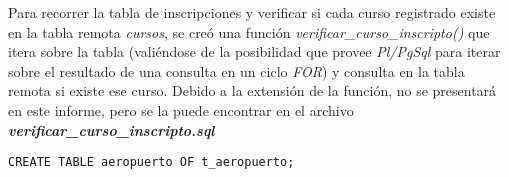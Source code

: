 Para recorrer la tabla de inscripciones y verificar si cada curso registrado existe en la tabla remota \emph{cursos}, se creó una función \emph{verificar\_curso\_inscripto()} que itera sobre la tabla (valiéndose de la posibilidad que provee \emph{Pl/PgSql} para iterar sobre el resultado de una consulta en un ciclo \emph{FOR}) y consulta en la tabla remota si existe ese curso. Debido a la extensión de la función, no se presentará en este informe, pero se la puede encontrar en el archivo \textbf{\emph{verificar\_curso\_inscripto.sql}}























\clearpage
\printbibliography




\vspace*{5mm}
\lstset{style=sql}
\begin{lstlisting}
CREATE TABLE aeropuerto OF t_aeropuerto;
\end{lstlisting}

